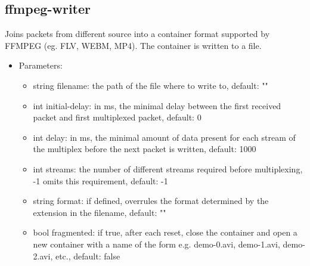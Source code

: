 \subsection{ffmpeg-writer}
Joins packets from different source into a container format supported by FFMPEG (eg. FLV, WEBM, MP4). The container is written to a file.
\begin{itemize}
\item Parameters:
\begin{itemize}
\item string filename: the path of the file where to write to, default: ""
\item int initial-delay: in ms, the minimal delay between the first received packet and first multiplexed packet, default: 0
\item int delay: in ms, the minimal amount of data present for each stream of the multiplex before the next packet is written, default: 1000
\item int streams: the number of different streams required before multiplexing, -1 omits this requirement, default: -1
\item string format: if defined, overrules the format determined by the extension in the filename, default: ""
\item bool fragmented: if true, after each reset, close the container and open a new container with a name of the form e.g. demo-0.avi, demo-1.avi, demo-2.avi, etc., default: false
\end{itemize}
\end{itemize}
\newpage
